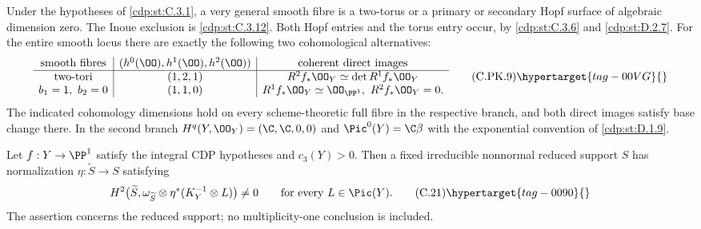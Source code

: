 \begin{proposition}\hypertarget{tag-01F6}{}\label{cdp:st:C.3.11}



Under the hypotheses of \ref{cdp:st:C.3.1}, a very general smooth fibre
is a two-torus or a primary or secondary Hopf surface of
algebraic dimension zero. The Inoue exclusion is \ref{cdp:st:C.3.12}.
Both Hopf
entries and the torus entry occur, by \ref{cdp:st:C.3.6} and \ref{cdp:st:D.2.7}.
For the entire smooth locus there are exactly the following
two cohomological alternatives:
\[
\begin{array}{c|c|c}
\text{smooth fibres}&
 (h^0(\OO),h^1(\OO),h^2(\OO))&
 \text{coherent direct images}\\ \hline
\text{two-tori}&(1,2,1)&
 R^2f_*\OO_Y\simeq\det R^1f_*\OO_Y\\
b_1=1,\ b_2=0&(1,1,0)&
 R^1f_*\OO_Y\simeq\OO_{\PP^1},\
 R^2f_*\OO_Y=0 .
\end{array}
\tag{C.PK.9}\hypertarget{tag-00VG}{}\label{cdp:eq:C.PK.9}
\]
The indicated cohomology dimensions hold on every
scheme-theoretic full fibre in the respective branch,
and both direct images satisfy base change there.
In the second branch
$H^q(Y,\OO_Y)=(\C,\C,0,0)$ and
$\Pic^0(Y)=\C\beta$ with the exponential convention
of \ref{cdp:st:D.1.9}.
\end{proposition}

\begin{proposition}\hypertarget{tag-01FO}{}\label{cdp:st:C4e}


Let $f:Y\to\PP^1$ satisfy the integral CDP hypotheses and $c_3(Y)>0$. Then a fixed irreducible nonnormal reduced support $S$ has normalization $\eta:\widetilde S\to S$ satisfying
\[
 H^2\bigl(\widetilde S,\omega_{\widetilde S}\otimes
           \eta^*(K_Y^{-1}\otimes L)\bigr)\ne0
 \qquad\hbox{for every }L\in\Pic(Y).                  \tag{C.21}\hypertarget{tag-0090}{}\label{cdp:eq:C.21}
\]
The assertion concerns the reduced support; no multiplicity-one conclusion is included.
\end{proposition}
